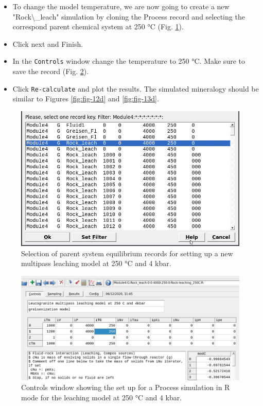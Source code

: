 \documentclass[
]{book}
\begin{document}
\begin{itemize}
\item
  To change the model temperature, we are now going to create a new "Rock\textbackslash\_leach" simulation by cloning the Process record and selecting the correspond parent chemical system at 250 °C (Fig. \ref{fig:fig-10d}).
\item
  Click next and Finish.
\item
  In the \texttt{Controls} window change the temperature to 250 °C. Make sure to save the record (Fig. \ref{fig:fig-11d}).
\item
  Click \texttt{Re-calculate} and plot the results. The simulated mineralogy should be similar to Figures \ref{fig:fig-12d} and \ref{fig:fig-13d}.
\end{itemize}

\begin{figure}
\includegraphics[width=0.7\linewidth]{figures/module4/fig-10} \caption{Selection of parent system equilibrium records for setting up a new multipass leaching model at 250 °C and 4 kbar.}\label{fig:fig-10d}
\end{figure}

\begin{figure}
\includegraphics[width=1\linewidth]{figures/module4/fig-11} \caption{Controls window showing the set up for a Process simulation in R mode for the leaching model at 250 °C and 4 kbar.}\label{fig:fig-11d}
\end{figure}
\end{document}
